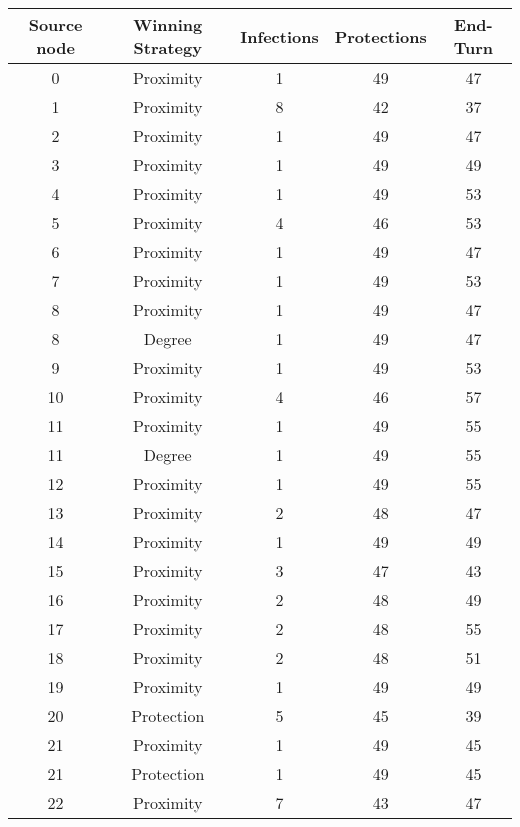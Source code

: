 \documentclass[results.tex]{subfiles}
\begin{document}
\begin{center}
  \begin{tabular}{| c || c | c | c | c |}
    \hline
    {\bfseries Source node} & {\bfseries Winning Strategy} & {\bfseries Infections} & {\bfseries Protections} & {\bfseries End-Turn} \\  %
    \hline\hline
    0 & Proximity & 1 & 49 & 47 \\ 
    \hline
    1 & Proximity & 8 & 42 & 37 \\ 
    \hline
    2 & Proximity & 1 & 49 & 47 \\ 
    \hline
    3 & Proximity & 1 & 49 & 49 \\ 
    \hline
    4 & Proximity & 1 & 49 & 53 \\ 
    \hline
    5 & Proximity & 4 & 46 & 53 \\ 
    \hline
    6 & Proximity & 1 & 49 & 47 \\ 
    \hline
    7 & Proximity & 1 & 49 & 53 \\ 
    \hline
    8 & Proximity & 1 & 49 & 47 \\ 
    \hline
    8 & Degree & 1 & 49 & 47 \\ 
    \hline
    9 & Proximity & 1 & 49 & 53 \\ 
    \hline
    10 & Proximity & 4 & 46 & 57 \\ 
    \hline
    11 & Proximity & 1 & 49 & 55 \\ 
    \hline
    11 & Degree & 1 & 49 & 55 \\ 
    \hline
    12 & Proximity & 1 & 49 & 55 \\ 
    \hline
    13 & Proximity & 2 & 48 & 47 \\ 
    \hline
    14 & Proximity & 1 & 49 & 49 \\ 
    \hline
    15 & Proximity & 3 & 47 & 43 \\ 
    \hline
    16 & Proximity & 2 & 48 & 49 \\ 
    \hline
    17 & Proximity & 2 & 48 & 55 \\ 
    \hline
    18 & Proximity & 2 & 48 & 51 \\ 
    \hline
    19 & Proximity & 1 & 49 & 49 \\ 
    \hline
    20 & Protection & 5 & 45 & 39 \\ 
    \hline
    21 & Proximity & 1 & 49 & 45 \\ 
    \hline
    21 & Protection & 1 & 49 & 45 \\ 
    \hline
    22 & Proximity & 7 & 43 & 47 \\ 

\end{tabular}
\end{center}
\end{document}
